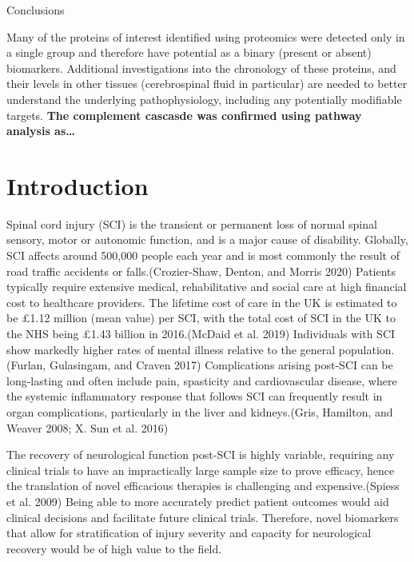 \documentclass[9pt,lineno]{elife}
\begin{document}
Conclusions

Many of the proteins of interest identified using proteomics were detected only in a single group and therefore have potential as a binary (present or absent) biomarkers.
Additional investigations into the chronology of these proteins, and their levels in other tissues (cerebrospinal fluid in particular) are needed to better understand the underlying pathophysiology, including any potentially modifiable targets.
\textbf{The complement cascasde was confirmed using pathway analysis as\ldots{}}

\hypertarget{introduction}{%
\section{Introduction}\label{introduction}}

Spinal cord injury (SCI) is the transient or permanent loss of normal spinal sensory, motor or autonomic function, and is a major cause of disability.
Globally, SCI affects around 500,000 people each year and is most commonly the result of road traffic accidents or falls.(Crozier-Shaw, Denton, and Morris 2020) Patients typically require extensive medical, rehabilitative and social care at high financial cost to healthcare providers. The lifetime cost of care in the UK is estimated to be £1.12 million (mean value) per SCI, with the total cost of SCI in the UK to the NHS being £1.43 billion in 2016.(McDaid et al. 2019) Individuals with SCI show markedly higher rates of mental illness relative to the general population.(Furlan, Gulasingam, and Craven 2017) Complications arising post-SCI can be long-lasting and often include pain, spasticity and cardiovascular disease, where the systemic inflammatory response that follows SCI can frequently result in organ complications, particularly in the liver and kidneys.(Gris, Hamilton, and Weaver 2008; X. Sun et al. 2016)

The recovery of neurological function post-SCI is highly variable, requiring any clinical trials to have an impractically large sample size to prove efficacy, hence the translation of novel efficacious therapies is challenging and expensive.(Spiess et al. 2009) Being able to more accurately predict patient outcomes would aid clinical decisions and facilitate future clinical trials.
Therefore, novel biomarkers that allow for stratification of injury severity and capacity for neurological recovery would be of high value to the field.
\end{document}
